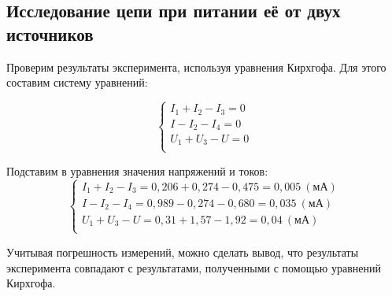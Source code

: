 \subsection{Исследование цепи при питании её от двух источников }

Проверим результаты эксперимента, используя уравнения Кирхгофа.
Для этого составим систему уравнений:

\begin{equation}
  \begin{cases}
    I_1 + I_2 - I_3 = 0 \\
    I - I_2 - I_4 = 0   \\
    U_1 + U_3 - U = 0   \\
  \end{cases}
\end{equation}

Подставим в уравнения значения напряжений и токов:
\begin{equation}
  \begin{cases}
    I_1 + I_2 - I_3 = 0,206 + 0,274 - 0,475 = 0,005\ (\text{мА}) \\ %
    I - I_2 - I_4   = 0,989 - 0,274 - 0,680 = 0,035\ (\text{мА})   \\ %
    U_1 + U_3 - U   = 0,31 + 1,57 - 1,92    = 0,04 \ (\text{мА})       \\ %
  \end{cases}
\end{equation}

Учитывая погрешность измерений, можно сделать вывод, что результаты
эксперимента совпадают с результатами, полученными с помощью
уравнений Кирхгофа.


